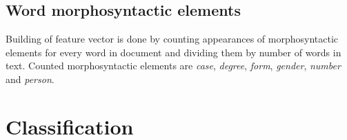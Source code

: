 \documentclass[11pt,english]{article}
\begin{document}
\begin{multicols}{2}
\subsection{Word morphosyntactic elements}
\label{sec:morphosyntactic}
Building of feature vector is done by counting appearances of morphosyntactic
elements for every word in document and dividing them by number of words in text.
Counted morphosyntactic elements are \emph{case}, \emph{degree}, \emph{form},
\emph{gender}, \emph{number} and \emph{person}.

\section{Classification}



\end{multicols}
\end{document}
